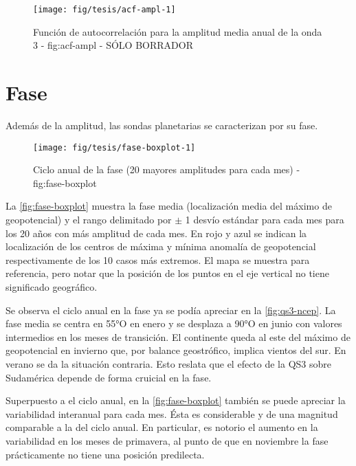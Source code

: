 \documentclass[spanish,a4paper]{book}
\begin{document}
\begin{figure*}
\texttt{[image: fig/tesis/acf-ampl-1]} \caption{Función de autocorrelación para la amplitud media anual de la onda 3 - fig:acf-ampl - SÓLO BORRADOR}\label{fig:acf-ampl}
\end{figure*}

\section{Fase}\label{fase}

Además de la amplitud, las sondas planetarias se caracterizan por su
fase. 

\begin{landscape}\begin{figure}

{\centering \texttt{[image: fig/tesis/fase-boxplot-1]} 

}

\caption{Ciclo anual de la fase (20 mayores amplitudes para cada mes) - fig:fase-boxplot}\label{fig:fase-boxplot}
\end{figure}
\end{landscape}

La \autoref{fig:fase-boxplot} muestra la fase media (localización media
del máximo de geopotencial) y el rango delimitado por \(\pm\) 1 desvío
estándar para cada mes para los 20 años con más amplitud de cada mes. En
rojo y azul se indican la localización de los centros de máxima y mínima
anomalía de geopotencial respectivamente de los 10 casos más extremos.
El mapa se muestra para referencia, pero notar que la posición de los
puntos en el eje vertical no tiene significado geográfico.

Se observa el ciclo anual en la fase ya se podía apreciar en la
\autoref{fig:qs3-ncep}. La fase media se centra en 55°O en enero y se
desplaza a 90°O en junio con valores intermedios en los meses de
transición. El continente queda al este del máximo de geopotencial en
invierno que, por balance geostrófico, implica vientos del sur. En
verano se da la situación contraria. Esto reslata que el efecto de la
QS3 sobre Sudamérica depende de forma cruicial en la fase.

Superpuesto a el ciclo anual, en la \autoref{fig:fase-boxplot} también
se puede apreciar la variabilidad interanual para cada mes. Ésta es
considerable y de una magnitud comparable a la del ciclo anual. En
particular, es notorio el aumento en la variabilidad en los meses de
primavera, al punto de que en noviembre la fase prácticamente no tiene
una posición predilecta.
\end{document}
